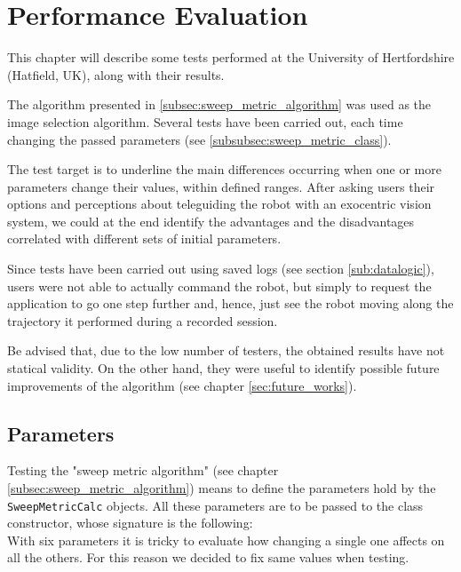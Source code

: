 \section{Performance Evaluation}
\label{sec:performance_evaluation}
%
This chapter will describe some tests performed at the 
University of Hertfordshire (Hatfield, UK), along with 
their results. 
%

%
The algorithm presented in \ref{subsec:sweep_metric_algorithm}
was used as the image selection algorithm. Several tests 
have been carried out, each time changing the passed parameters
(see \ref{subsubsec:sweep_metric_class}).
%

%
The test target is to underline the main differences 
occurring when one or more parameters change their values, 
within defined ranges. After asking users their options 
and perceptions about teleguiding the robot with an 
exocentric vision system, we could at the end identify 
the advantages and the disadvantages correlated with 
different sets of initial parameters.
%

%
Since tests have been carried out using saved logs 
(see section \ref{sub:datalogic}), users were not 
able to actually command the robot, but simply 
to request the application to go one step
further and, hence, just see the robot moving along 
the trajectory it performed during a recorded 
session.
%

%
Be advised that, due to the low number of testers, 
the obtained results have not statical validity.
%
On the other hand, they were useful to identify 
possible future improvements of the algorithm 
(see chapter \ref{sec:future_works}).
%
\subsection{Parameters}
\label{subsec:parameters}

Testing the "sweep metric algorithm" (see chapter \ref{subsec:sweep_metric_algorithm}) means to define
the parameters hold by the \texttt{SweepMetricCalc} objects. All these parameters are 
to be passed to the class constructor, whose signature is the following:
\\
With six parameters it is tricky to evaluate how changing a single one affects on all the others. For this
reason we decided to fix same values when testing.
%


